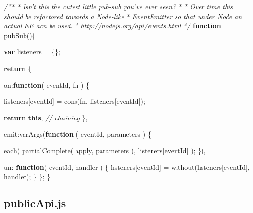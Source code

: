 \documentclass[]{article}
\newenvironment{Shaded}{}{}
\newcommand{\KeywordTok}[1]{\textcolor[rgb]{0.00,0.44,0.13}{\textbf{{#1}}}}
\newcommand{\DataTypeTok}[1]{\textcolor[rgb]{0.56,0.13,0.00}{{#1}}}
\newcommand{\CommentTok}[1]{\textcolor[rgb]{0.38,0.63,0.69}{\textit{{#1}}}}
\newcommand{\FunctionTok}[1]{\textcolor[rgb]{0.02,0.16,0.49}{{#1}}}
\newcommand{\NormalTok}[1]{{#1}}
\begin{document}
\begin{Shaded}
\begin{Highlighting}[]
\CommentTok{/**}
\CommentTok{ * Isn't this the cutest little pub-sub you've ever seen?}
\CommentTok{ * }
\CommentTok{ * Over time this should be refactored towards a Node-like}
\CommentTok{ *    EventEmitter so that under Node an actual EE acn be used.}
\CommentTok{ *    http://nodejs.org/api/events.html}
\CommentTok{ */}
\KeywordTok{function} \FunctionTok{pubSub}\NormalTok{()\{}

   \KeywordTok{var} \NormalTok{listeners = \{\};}
                             
   \KeywordTok{return} \NormalTok{\{}

      \DataTypeTok{on}\NormalTok{:}\KeywordTok{function}\NormalTok{( eventId, fn ) \{}
         
         \NormalTok{listeners[eventId] = }\FunctionTok{cons}\NormalTok{(fn, listeners[eventId]);}

         \KeywordTok{return} \KeywordTok{this}\NormalTok{; }\CommentTok{// chaining}
      \NormalTok{\}, }
    
      \DataTypeTok{emit}\NormalTok{:}\FunctionTok{varArgs}\NormalTok{(}\KeywordTok{function} \NormalTok{( eventId, parameters ) \{}
               
         \FunctionTok{each}\NormalTok{( }
            \FunctionTok{partialComplete}\NormalTok{( apply, parameters ), }
            \NormalTok{listeners[eventId]}
         \NormalTok{);}
      \NormalTok{\}),}
      
      \DataTypeTok{un}\NormalTok{: }\KeywordTok{function}\NormalTok{( eventId, handler ) \{}
         \NormalTok{listeners[eventId] = }\FunctionTok{without}\NormalTok{(listeners[eventId], handler);}
      \NormalTok{\}           }
   \NormalTok{\};}
\NormalTok{\}}
\end{Highlighting}
\end{Shaded}

\pagebreak

\subsection{publicApi.js}

\label{src_publicApi}
\end{document}
